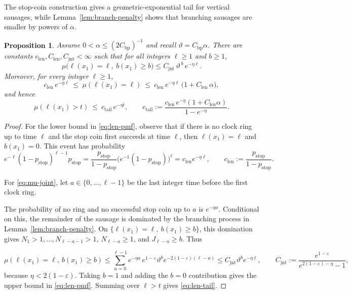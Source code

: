 \documentclass[letterpaper,11pt,reqno]{amsart}
\newtheorem{prop}[thm]{Proposition}
\theoremstyle{definition}
\begin{document}
The stop-coin construction gives a geometric-exponential tail for vertical sausages, while Lemma~\ref{lem:branch-penalty} shows that branching sausages are smaller by powers of \(\alpha\).



\begin{prop}\label{prop:sausagetail}
Assume \(0<\alpha\le(2C_{\mathrm{bp}})^{-1}\) and recall
\(\vartheta=C_{\mathrm{bp}}\alpha\). There are constants
\(c_{\mathrm{len}},C_{\mathrm{len}},C_{\mathrm{jnt}}<\infty\) such that for all integers $\ell\ge1$ and $b\ge1$,
\begin{equation}\label{eq:mu-joint}
\mu\big(\ell(x_1)=\ell,\ b(x_1)\ge b\big)\le C_{\mathrm{jnt}}\,\vartheta^{\,b}\,e^{-\eta\ell}.
\end{equation}
Moreover, for every integer $\ell\ge1$,
\begin{equation}\label{eq:len-pmf}
c_{\mathrm{len}}\,e^{-\eta \ell}
\ \le\ \mu(\ell(x_1)=\ell)
\ \le\ c_{\mathrm{len}}\,e^{-\eta \ell}\,\bigl(1+C_{\mathrm{len}}\,\alpha\bigr),
\end{equation}
and hence
\begin{equation}\label{eq:len-tail}
\mu(\ell(x_1)>t)\ \le\ 
c_{\mathrm{tail}}\,e^{-\eta t},
\qquad
c_{\mathrm{tail}}:=\frac{c_{\mathrm{len}}\,e^{-\eta}(1+C_{\mathrm{len}}\alpha)}{1-e^{-\eta}}.
\end{equation}
\end{prop}


\begin{proof}
For the lower bound in \eqref{eq:len-pmf}, observe that if there is no clock ring up to time \(\ell\) and the stop coin first succeeds at time \(\ell\), then \(\ell(x_1)=\ell\) and \(b(x_1)=0\). This event has probability
\[
e^{-\ell}(1-p_{\mathrm{stop}})^{\ell-1}p_{\mathrm{stop}}
=
\frac{p_{\mathrm{stop}}}{1-p_{\mathrm{stop}}}
\bigl(e^{-1}(1-p_{\mathrm{stop}})\bigr)^\ell
=
c_{\mathrm{len}}e^{-\eta\ell},
\qquad
c_{\mathrm{len}}:=\frac{p_{\mathrm{stop}}}{1-p_{\mathrm{stop}}}.
\]

For \eqref{eq:mu-joint}, let \(a\in\{0,\ldots,\ell-1\}\) be the last integer time before
the first clock ring. 

The probability of no ring and no successful stop coin up to \(a\) is
\(e^{-\eta a}\). Conditional on this, the remainder of the sausage is dominated by the branching
process in Lemma~\ref{lem:branch-penalty}. On
\(\{\ell(x_1)=\ell,\ b(x_1)\ge b\}\), this domination gives
\(N_1>1,\ldots,N_{\ell-a-1}>1\), \(N_{\ell-a}\ge1\), and
\(J_{\ell-a}\ge b\). Thus


\[
\mu(\ell(x_1)=\ell,\ b(x_1)\ge b)
\le
\sum_{a=0}^{\ell-1}
e^{-\eta a}\,
e^{1-\varepsilon}\vartheta^b e^{-2(1-\varepsilon)(\ell-a)}
\le
C_{\mathrm{jnt}}\vartheta^b e^{-\eta\ell},\qquad
C_{\mathrm{jnt}}:=\frac{e^{1-\varepsilon}}{e^{2(1-\varepsilon)-\eta}-1},
\]
because \(\eta<2(1-\varepsilon)\). Taking \(b=1\) and adding the \(b=0\) contribution gives the
upper bound in \eqref{eq:len-pmf}. Summing over \(\ell>t\) gives
\eqref{eq:len-tail}.

\end{proof}
\end{document}

